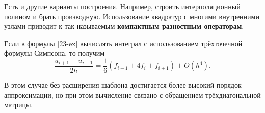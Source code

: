 Есть и другие варианты построения. Например, строить интерполяционный полином
и брать производную. Использование квадратур с многими внутренними узлами приводит
к так называемым \textbf{компактным разностным операторам}.

Если в формулы \eqref{23-ex} вычислять интеграл с использованием трёхточечной
формулы Симпсона, то получим
\begin{equation}
  \dfrac{u_{i + 1} - u_{i - 1}}{2h} = \dfrac{1}{6}(f_{i - 1} + 4f_i + f_{i + 1})
  + O(h^4).
\end{equation}

В этом случае без расширения шаблона достигается более высокий порядок аппроксимации,
но при этом вычисление связано с обращением трёхдиагональной матрицы.
